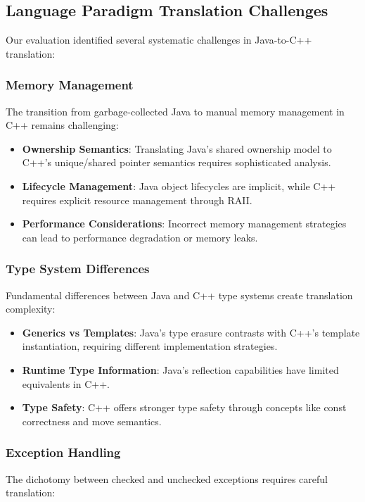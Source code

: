 \subsection{Language Paradigm Translation Challenges}

Our evaluation identified several systematic challenges in Java-to-C++ translation:

\subsubsection{Memory Management}
The transition from garbage-collected Java to manual memory management in C++ remains challenging:

\begin{itemize}
\item \textbf{Ownership Semantics}: Translating Java's shared ownership model to C++'s unique/shared pointer semantics requires sophisticated analysis.
\item \textbf{Lifecycle Management}: Java object lifecycles are implicit, while C++ requires explicit resource management through RAII.
\item \textbf{Performance Considerations}: Incorrect memory management strategies can lead to performance degradation or memory leaks.
\end{itemize}

\subsubsection{Type System Differences}
Fundamental differences between Java and C++ type systems create translation complexity:

\begin{itemize}
\item \textbf{Generics vs Templates}: Java's type erasure contrasts with C++'s template instantiation, requiring different implementation strategies.
\item \textbf{Runtime Type Information}: Java's reflection capabilities have limited equivalents in C++.
\item \textbf{Type Safety}: C++ offers stronger type safety through concepts like const correctness and move semantics.
\end{itemize}

\subsubsection{Exception Handling}
The dichotomy between checked and unchecked exceptions requires careful translation:

